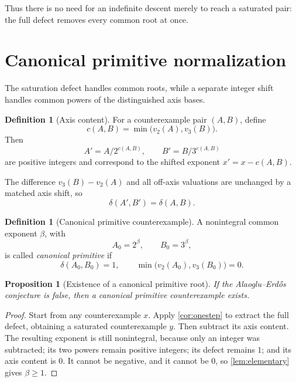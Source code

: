\documentclass[11pt]{article}
\numberwithin{equation}{section}
\newtheorem{proposition}[theorem]{Proposition}
\theoremstyle{definition}
\newtheorem{definition}[theorem]{Definition}
\newcommand{\defect}{\delta}
\begin{document}
Thus there is no need for an indefinite descent merely to reach a saturated pair: the full defect removes every common root at once.

\section{Canonical primitive normalization}

The saturation defect handles common roots, while a separate integer shift handles common powers of the distinguished axis bases.

\begin{definition}[Axis content]\label{def:axiscontent}
For a counterexample pair \((A,B)\), define
\[
       c(A,B)=\min\bigl(v_2(A),v_3(B)\bigr).
\]
Then
\[
 A'=A/2^{c(A,B)},\qquad B'=B/3^{c(A,B)}
\]
are positive integers and correspond to the shifted exponent \(x'=x-c(A,B)\).
\end{definition}

The difference \(v_3(B)-v_2(A)\) and all off-axis valuations are unchanged by a matched axis shift, so
\[
       \defect(A',B')=\defect(A,B).
\]

\begin{definition}[Canonical primitive counterexample]\label{def:canonical}
A nonintegral common exponent \(\beta\), with
\[
        A_0=2^\beta,\qquad B_0=3^\beta,
\]
is called \emph{canonical primitive} if
\begin{equation}\label{eq:canonicalconditions}
  \defect(A_0,B_0)=1,
  \qquad
  \min\bigl(v_2(A_0),v_3(B_0)\bigr)=0.
\end{equation}
\end{definition}

\begin{proposition}[Existence of a canonical primitive root]\label{prop:canonicalexist}
If the Alaoglu--Erd\H{o}s conjecture is false, then a canonical primitive counterexample exists.
\end{proposition}

\begin{proof}
Start from any counterexample \(x\). Apply \cref{cor:onestep} to extract the full defect, obtaining a saturated counterexample \(y\). Then subtract its axis content. The resulting exponent is still nonintegral, because only an integer was subtracted; its two powers remain positive integers; its defect remains \(1\); and its axis content is \(0\). It cannot be negative, and it cannot be \(0\), so \cref{lem:elementary} gives \(\beta\ge1\).
\end{proof}
\end{document}
